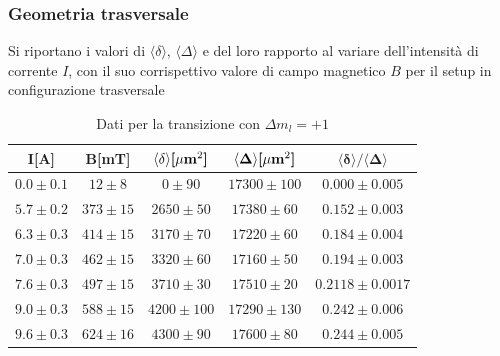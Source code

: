 \subsubsection{Geometria trasversale}
\label{sec:trasv}
Si riportano i valori di $\langle\delta\rangle$, $\langle\Delta\rangle$ e del loro
rapporto al variare dell'intensità di corrente $I$, con il suo corrispettivo valore
di campo magnetico $B$ per il setup in configurazione trasversale
\begin{table}[H]
    \centering
    \begin{tabular}{|c|c|c|c|c|} \hline

\textbf{I[A]} & \textbf{B[mT]} & $\mathbf{\langle\delta\rangle}\text{\textbf{[}}\mathbf{\mu}\text{\textbf{m}}^2\textbf{]}$  & $\mathbf{\langle\Delta\rangle}\text{\textbf{[}}\mathbf{\mu}\text{\textbf{m}}^2\textbf{]}$  & $\mathbf{\langle\delta\rangle/\langle\Delta\rangle}$ \\ \hline\hline
$0.0	\pm0.1$&$12	\pm8	$&$0	\pm90	$&$17300\pm100	$&$0.000	\pm0.005$  \\ \hline
$5.7	\pm0.2$&$373	\pm15	$&$2650	\pm50	$&$17380\pm60	$&$0.152	\pm0.003$  \\ \hline
$6.3	\pm0.3$&$414	\pm15	$&$3170	\pm70	$&$17220\pm60	$&$0.184	\pm0.004$  \\ \hline
$7.0	\pm0.3$&$462	\pm15	$&$3320	\pm60	$&$17160\pm50	$&$0.194	\pm0.003$  \\ \hline
$7.6	\pm0.3$&$497	\pm15	$&$3710	\pm30	$&$17510\pm20	$&$0.2118	\pm0.0017$ \\ \hline
$9.0	\pm0.3$&$588	\pm15	$&$4200	\pm100	$&$17290\pm130	$&$0.242	\pm0.006$  \\ \hline
$9.6	\pm0.3$&$624	\pm16	$&$4300	\pm90	$&$17600\pm80	$&$0.244	\pm0.005$  \\ \hline
\end{tabular}
    \label{tab:trasv_up}
    \caption{Dati per la transizione con $\Delta m_l = +1$}
\end{table}
